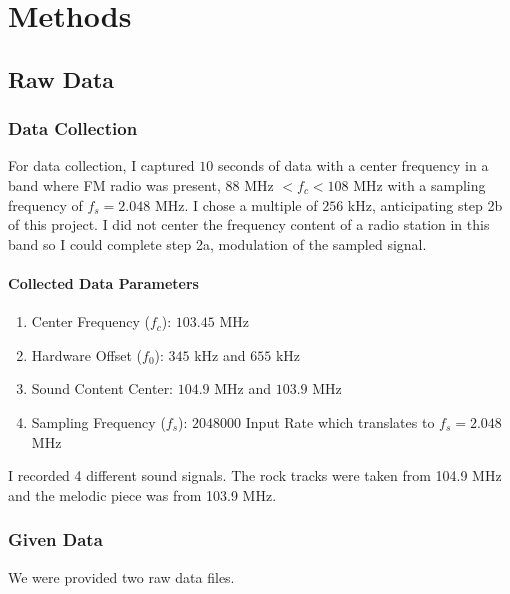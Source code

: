 \documentclass{article}
\begin{document}
\section{Methods}

\subsection{Raw Data}

\subsubsection{Data Collection}

For data collection, I captured $10$ seconds of data with a center frequency in a band where FM radio was present, $88$ MHz $ < f_c < 108$ MHz with a sampling frequency of $f_s = 2.048$ MHz. I chose a multiple of $256$ kHz, anticipating step 2b of this project. I did not center the frequency content of a radio station in this band so I could complete step 2a, modulation of the sampled signal.

\paragraph{Collected Data Parameters}

\begin{enumerate}
    \item Center Frequency ($f_c$): $103.45$ MHz
    \item Hardware Offset ($f_0$): $345$ kHz and $655$ kHz
    \item Sound Content Center: $104.9$ MHz and $103.9$ MHz
    \item Sampling Frequency ($f_s$): $2048000$ Input Rate which translates to $f_s = 2.048$ MHz %
\end{enumerate}

\noindent I recorded 4 different sound signals. The rock tracks were taken from 104.9 MHz and the melodic piece was from 103.9 MHz.

\subsubsection{Given Data}


We were provided two raw data files. 
\end{document}
